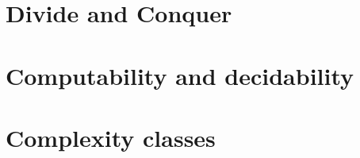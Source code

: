 









\tableofcontents
\newpage
{}





\part{Divide and Conquer}














\part{Computability and decidability}

\part{Complexity classes}




